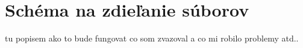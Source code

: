 \chapter{Schéma na zdieľanie súborov}

tu popisem ako to bude fungovat co som zvazoval a co mi robilo problemy atd..